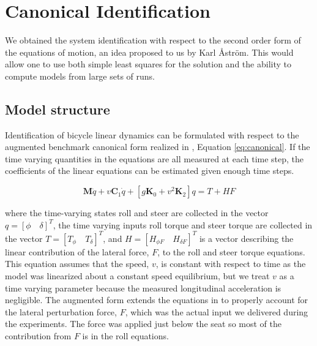 \documentclass[a4paper]{article}
\begin{document}

\section{Canonical Identification}
\label{sec:canonical-identification}


We obtained the system identification with respect to the second order form of the equations of
motion, an idea proposed to us by Karl Åström. This would allow one to use both
simple least squares for the solution and the ability to compute models from
large sets of runs. 

\subsection{Model structure}

Identification of bicycle linear dynamics can be formulated with
respect to the augmented benchmark canonical form realized in
\cite{Meijaard2007}, Equation \ref{eq:canonical}. If the time varying
quantities in the equations are all measured at each time step, the
coefficients of the linear equations can be estimated given enough time steps.

\begin{equation}
  \mathbf{M} \ddot{q} + v \mathbf{C}_1 \dot{q} + [g \mathbf{K}_0 + v^2
  \mathbf{K}_2] q = T + H F
  \label{eq:canonical}
\end{equation}

where the time-varying states roll and steer are collected in the vector $q =
[\phi \quad \delta]^T$, the time varying inputs roll torque and steer torque
are collected in the vector $T = [T_\phi \quad T_\delta]^T$, and $H = [H_{\phi
F} \quad H_{\delta F}]^T$ is a vector describing the linear contribution of the
lateral force, $F$, to the roll and steer torque equations. This equation
assumes that the speed, $v$, is constant with respect to time as the model was
linearized about a constant speed equilibrium, but we treat $v$ as a time
varying parameter because the measured longitudinal acceleration is negligible.
The augmented form extends the equations in \cite{Meijaar2007} to properly
account for the lateral perturbation force, $F$, which was the actual input we
delivered during the experiments. The force was applied just below the seat so
most of the contribution from $F$ is in the roll equations.
\end{document}
